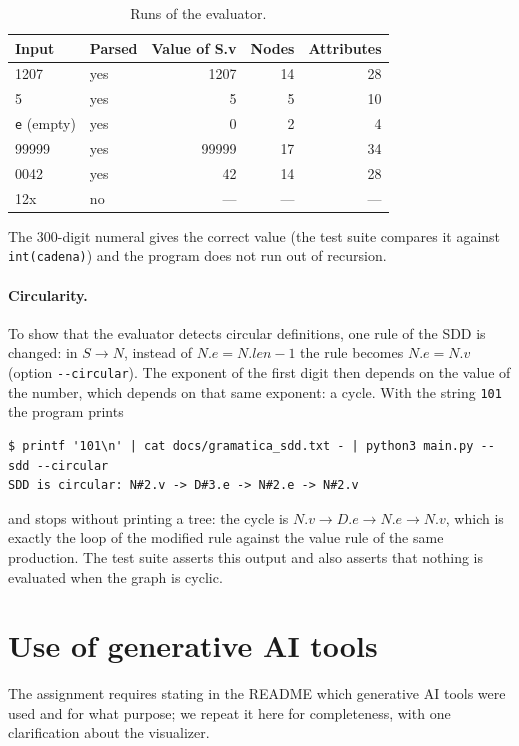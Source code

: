\documentclass[11pt,letterpaper]{article}
\newcommand{\nt}[1]{\texttt{#1}}
\begin{document}
\begin{table}[H]
\centering
\small
\caption{Runs of the evaluator.}
\label{tab:pruebas}
\begin{tabular}{@{}l l r r r@{}}
\toprule
\textbf{Input} & \textbf{Parsed} & \textbf{Value of S.v} & \textbf{Nodes} & \textbf{Attributes}\\
\midrule
1207 & yes & 1207 & 14 & 28\\
5 & yes & 5 & 5 & 10\\
\nt{e} (empty) & yes & 0 & 2 & 4\\
99999 & yes & 99999 & 17 & 34\\
0042 & yes & 42 & 14 & 28\\
12x & no & --- & --- & ---\\
\bottomrule
\end{tabular}
\end{table}

The 300-digit numeral gives the correct value (the test suite compares it against
\nt{int(cadena)}) and the program does not run out of recursion.

\paragraph{Circularity.} To show that the evaluator detects circular definitions, one rule of the
SDD is changed: in $S \to N$, instead of $N.e = N.len - 1$ the rule becomes $N.e = N.v$ (option
\nt{-{}-circular}). The exponent of the first digit then depends on the value of the number, which
depends on that same exponent: a cycle. With the string \nt{101} the program prints

\begin{lstlisting}[style=consola]
$ printf '101\n' | cat docs/gramatica_sdd.txt - | python3 main.py --sdd --circular
SDD is circular: N#2.v -> D#3.e -> N#2.e -> N#2.v
\end{lstlisting}

and stops without printing a tree: the cycle is $N.v \to D.e \to N.e \to N.v$, which is exactly the
loop of the modified rule against the value rule of the same production. The test suite asserts
this output and also asserts that nothing is evaluated when the graph is cyclic.

\section{Use of generative AI tools}

The assignment requires stating in the README which generative AI tools were used and for what
purpose; we repeat it here for completeness, with one clarification about the visualizer.
\end{document}
